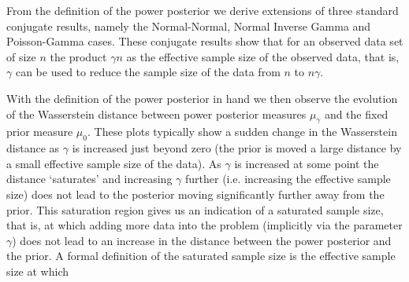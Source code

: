 \documentclass[12pt]{article}
\begin{document}

From the definition of the power posterior we derive extensions of three
standard conjugate results, namely the Normal-Normal, Normal Inverse Gamma and
Poisson-Gamma cases. These conjugate results show that for an observed data set
of size $n$ the product $\gamma n$ as the effective sample size of the observed
data, that is, $\gamma$ can be used to reduce the sample size of the data from
$n$ to $n\gamma$. 

With the definition of the power posterior in hand we then observe the
evolution of the Wasserstein distance between power posterior measures
$\mu_{\gamma}$ and the fixed prior measure $\mu_{0}$. These plots typically show a sudden change in the Wasserstein distance as $\gamma$ is increased just beyond zero (the prior is moved a large distance by a small effective sample size of the data). As $\gamma$ is increased at some point the distance `saturates' and increasing $\gamma$ further (i.e. increasing the effective sample size) does not lead to the posterior moving significantly further away from the prior. This saturation region gives us an indication of a saturated sample size, that is, at which adding more data into the problem (implicitly
via the parameter $\gamma$) does not lead to an increase in the distance
between the power posterior and the prior.  A formal definition of the saturated sample size is the effective sample size at which 
\end{document}
